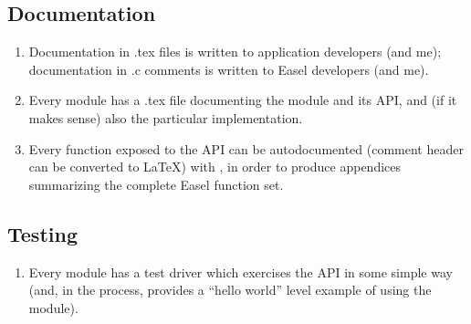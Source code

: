 \subsection{Documentation}

\begin{enumerate}
\item Documentation in .tex files is written to application developers
      (and me); documentation in .c comments is written to Easel
      developers (and me).

\item Every module has a .tex file documenting the module and its API,
      and (if it makes sense) also the particular implementation.

\item Every function exposed to the API can be autodocumented (comment
      header can be converted to \LaTeX) with
      , in order to produce appendices
      summarizing the complete Easel function set.
\end{enumerate}


\subsection{Testing}

\begin{enumerate}

\item Every module has a test driver which exercises the API in some
      simple way (and, in the process, provides a ``hello world''
      level example of using the module).

\end{enumerate}











